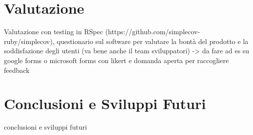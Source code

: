 \documentclass[target=bach,aauheader=,style=]{thud}
\begin{document}
\chapter{Valutazione}

Valutazione con testing in RSpec (https://github.com/simplecov-ruby/simplecov), questionario sul software per valutare
la bontà del prodotto e la soddisfazione degli utenti (va bene anche il team sviluppatori) -> da fare ad es su google forms o
microsoft forms con likert e domanda aperta per raccogliere feedback

\chapter{Conclusioni e Sviluppi Futuri}

conclusioni e sviluppi futuri


\appendix



\backmatter

\end{document}
